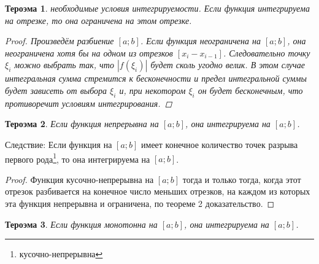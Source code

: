 \documentclass[oneside]{book}
\newtheorem{thm}{Тероэма}[chapter] %
\begin{document}
\begin{itemize}
\begin{enumerate}
\begin{thm}
  необходимые условия интегрируемости. Если функция интегрируема на отрезке, то она ограничена на этом отрезке.
  \begin{proof}
    Произведём разбиение $[a;b]$. Если функция неограничена на $[a;b]$, она неограничена хотя бы на одном из отрезков $[x_i - x_{i-1}]$.
    Следовательно точку $\xi_i$ можно выбрать так, что  $|f(\xi_i)|$ будет сколь угодно велик. В этом случае интегральная сумма стремится
    к бесконечности и предел интегральной суммы будет зависеть от выбора $\xi_i$ и, при некотором $\xi_i$ он будет бесконечным,
    что противоречит условиям интегрирования.
  \end{proof}
\end{thm}

\begin{thm}
  Если функция непрерывна на $[a;b]$, она интегрируема на $[a;b]$.
\end{thm}
Следствие: Если функция на $[a;b]$ имеет конечное количество точек разрыва первого рода\footnote{кусочно-непрерывна}, то она интегрируема на $[a;b]$.
\begin{proof}
  Функция кусочно-непрерывна на $[a;b]$ тогда и только тогда, когда этот отрезок разбивается на конечное число меньших отрезков,
  на каждом из которых эта функция непрерывна и ограничена, по теореме 2 доказательство.
\end{proof}

\begin{thm}
  Если функция монотонна на $[a;b]$, она интегрируема на $[a;b]$.
\end{thm}


\end{enumerate}
\end{itemize}
\end{document}
